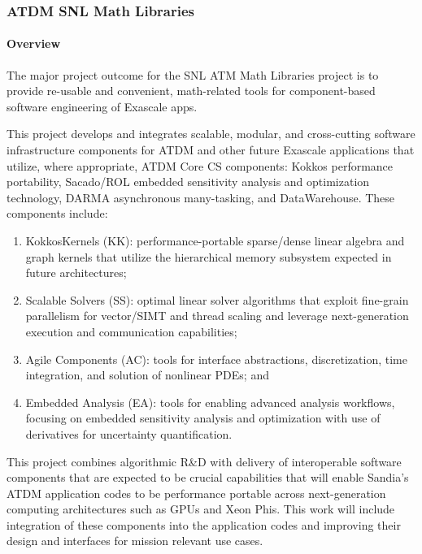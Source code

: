 \subsubsection{ ATDM SNL Math Libraries} \label{subsubsect:trilinos}

\paragraph{Overview} 
The major project outcome for the SNL ATM Math Libraries project is to provide re-usable and convenient, math-related tools for component-based software engineering of Exascale apps.

This project develops and integrates scalable, modular, and cross-cutting software infrastructure components for ATDM and other future Exascale applications that utilize, where appropriate, ATDM Core CS components: Kokkos performance portability, Sacado/ROL embedded sensitivity analysis and optimization technology, DARMA asynchronous many-tasking, and DataWarehouse.  These components include:
\begin{enumerate}
\item	KokkosKernels (KK):  performance-portable sparse/dense linear algebra and graph kernels that utilize the hierarchical memory subsystem expected in future architectures;
\item	Scalable Solvers (SS):  optimal linear solver algorithms that exploit fine-grain parallelism for vector/SIMT and thread scaling and leverage next-generation execution and communication capabilities;
\item	Agile Components (AC):  tools for interface abstractions, discretization, time integration, and solution of nonlinear PDEs; and 
\item Embedded Analysis (EA):  tools for enabling advanced analysis workflows, focusing on embedded sensitivity analysis and optimization with use of derivatives for uncertainty quantification.
\end{enumerate}

This project combines algorithmic R\&D with delivery of interoperable software components that are expected to be crucial capabilities that will enable Sandia's ATDM application codes to be performance portable across next-generation computing architectures such as GPUs and Xeon Phis.  This work will include integration of these components into the application codes and improving their design and interfaces for mission relevant use cases.	


